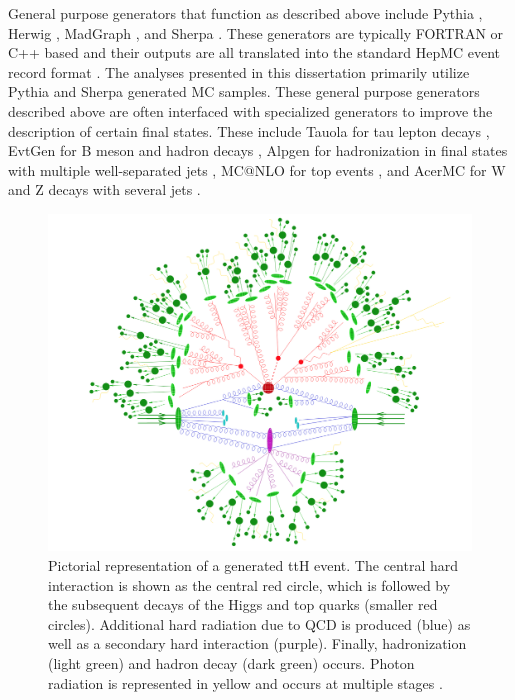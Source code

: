 General purpose generators that function as described above include Pythia \cite{pythia}, Herwig \cite{herwig}, MadGraph \cite{madgraph}, and Sherpa \cite{sherpa_egen}. These generators are typically FORTRAN or C++ based and their outputs are all translated into the standard HepMC event record format \cite{hepmc}. The analyses presented in this dissertation primarily utilize Pythia and Sherpa generated MC samples. These general purpose generators described above are often interfaced with specialized generators to improve the description of certain final states. These include Tauola for tau lepton decays \cite{tauola}, EvtGen for B meson and hadron decays \cite{evtgen}, Alpgen for hadronization in final states with multiple well-separated jets \cite{alpgen}, MC@NLO for top events \cite{mcnlo}, and AcerMC for W and Z decays with several jets \cite{acermc}.\\

\begin{figure}[h]
    \centering
    \includegraphics[width=5in]{figures/chapter3/event_gen.png}
    \caption{Pictorial representation of a generated ttH event. The central hard interaction is shown as the central red circle, which is followed by the subsequent decays of the Higgs and top quarks (smaller red circles). Additional hard radiation due to QCD is produced (blue) as well as a secondary hard interaction (purple). Finally, hadronization (light green) and hadron decay (dark green) occurs. Photon radiation is represented in yellow and occurs at multiple stages \cite{sherpa_egen}.}
    \label{fig:event_gen}
\end{figure}

